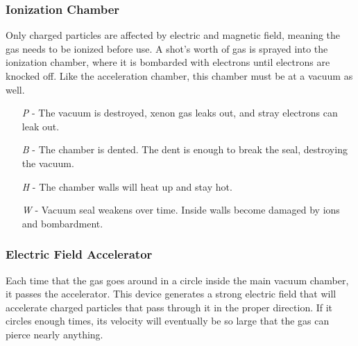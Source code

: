 \documentclass[a4paper]{article}
\begin{document}
\vspace{-0.5cm} \hspace{-18pt} \subsubsection{Ionization Chamber} \label{ray_ionization} \vspace{-0.2cm}
Only charged particles are affected by electric and magnetic field, meaning the gas needs to be ionized before use. A shot's worth of gas is sprayed into the ionization chamber, where it is bombarded with electrons until electrons are knocked off. Like the acceleration chamber, this chamber must be at a vacuum as well.
\begin{enumerate}
\item [\textit{P}] - The vacuum is destroyed, xenon gas leaks out, and stray electrons can leak out.
\item [\textit{B}] - The chamber is dented. \newline \hspace*{3pt} The dent is enough to break the seal, destroying the vacuum.
\item [\textit{H}] - The chamber walls will heat up and stay hot.
\item [\textit{W}] - Vacuum seal weakens over time. Inside walls become damaged by ions and bombardment.
\end{enumerate}

\vspace{-0.5cm} \hspace{-18pt} \subsubsection{Electric Field Accelerator} \label{ray_accelerator} \vspace{-0.2cm}
Each time that the gas goes around in a circle inside the main vacuum chamber, it passes the accelerator. This device generates a strong electric field that will accelerate charged particles that pass through it in the proper direction. If it circles enough times, its velocity will eventually be so large that the gas can pierce nearly anything.
\end{document}
